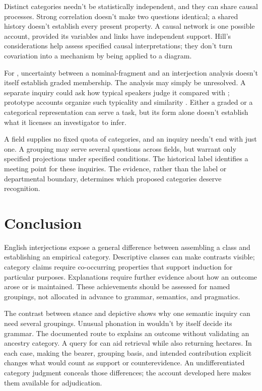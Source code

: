 \documentclass[12pt]{article}
\begin{document}
Distinct categories needn't be statistically independent, and they can
share causal processes. Strong correlation doesn't make two questions
identical; a shared history doesn't establish every present property.
A causal network is one possible account, provided its variables and
links have independent support. Hill's considerations help assess
specified causal interpretations; they don't turn covariation into
a mechanism by being applied to a diagram.

For , uncertainty between a nominal-fragment and an
interjection analysis doesn't itself establish graded membership. The
analysis may simply be unresolved. A separate inquiry could ask how
typical speakers judge it compared with ; prototype
accounts organize such typicality and similarity \citep{rosch1975,taylor2003}.
Either a graded or a categorical representation can serve a task,
but its form alone doesn't establish what it licenses an investigator
to infer.

A field supplies no fixed quota of categories, and an inquiry
needn't end with just one. A grouping may serve several questions across
fields, but warrant only specified projections under specified conditions.
The historical label  identifies a meeting point for
these inquiries. The evidence, rather than the label or departmental
boundary, determines which proposed categories deserve recognition.

\section{Conclusion}\label{sec:conclusion}

English interjections expose a general difference between assembling a
class and establishing an empirical category. Descriptive classes can
make contrasts visible; category claims require co-occurring properties
that support induction for particular purposes. Explanations require
further evidence about how an outcome arose or is maintained. These
achievements should be assessed for named groupings, not allocated in
advance to grammar, semantics, and pragmatics.

The contrast between stance  and depictive 
shows why one semantic inquiry can need several groupings. Unusual
phonation in  wouldn't by itself decide its grammar.
The documented route to  explains an outcome without
validating an ancestry category. A query for  can aid
retrieval while also returning hectares.
In each case, making the bearer, grouping basis, and intended contribution
explicit changes what would count as support or counterevidence.
An undifferentiated category judgment conceals those differences; the
account developed here makes them available for adjudication.
\end{document}
